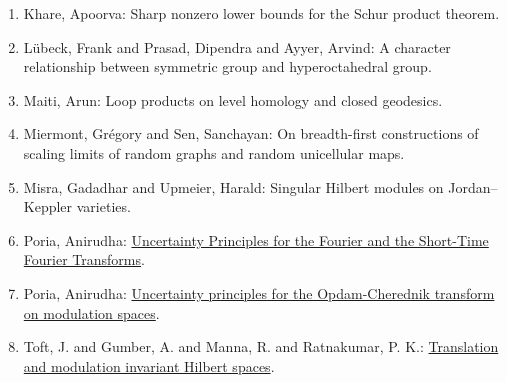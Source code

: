 \begin{enumerate}[resume, leftmargin=27pt]
	\item Khare, Apoorva: Sharp nonzero lower bounds for the Schur product theorem.

	\item L\"ubeck, Frank and Prasad, Dipendra and Ayyer, Arvind: A character relationship between symmetric group and hyperoctahedral group.

	\item Maiti, Arun: Loop products on level homology and closed geodesics.

	\item Miermont, Gr\'egory and Sen, Sanchayan: On breadth-first constructions of scaling limits of random graphs and random unicellular maps.


	\item\label{Misra:Jordan-Keppler} Misra, Gadadhar and Upmeier, Harald: Singular Hilbert modules on
	      Jordan--Keppler varieties.

	\item Poria, Anirudha: \href{https://arxiv.org/abs/2004.04184}{Uncertainty Principles for the Fourier and the Short-Time Fourier Transforms}.

	\item Poria, Anirudha: \href{https://arxiv.org/abs/2005.14274}{Uncertainty principles for the Opdam-Cherednik transform on modulation spaces}.



	\item Toft, J. and Gumber, A. and Manna, R. and Ratnakumar, P. K.: \href{https://arxiv.org/abs/2004.02430v1}{Translation and modulation invariant Hilbert spaces}.
\end{enumerate}


\vspace{-2.5mm}

